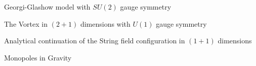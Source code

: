 \begin{section}{Georgi-Glashow model with $SU(2)$ gauge symmetry}
  \label{sec:monopole}
  
\end{section}

\begin{section}{The Vortex in $(2+1)$ dimensions with $U(1)$ gauge symmetry}
  \label{sec:vortex}
  
\end{section}

\begin{section}{Analytical continuation of the String field configuration in $(1+1)$ dimensions}
  \label{sec:analytc}
  
\end{section}

\begin{section}{Monopoles in Gravity}
  \label{sec:gravity}
  
\end{section}

\newpage
\appendix
\appendixpage
\addappheadtotoc


